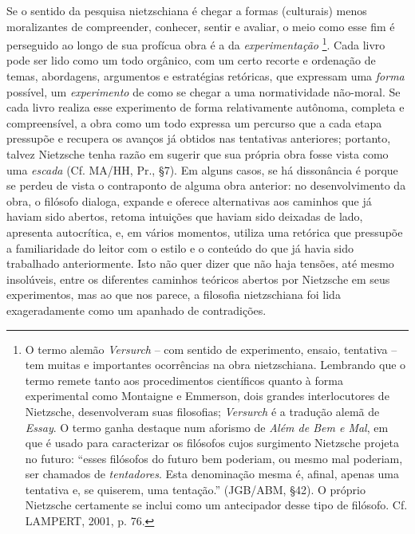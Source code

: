 \documentclass[
	12pt,				%
	openright,			%
	oneside,			%
	a4paper,			%
	english,			%
	french,				%
	spanish,			%
	brazil				%
	]{abntex2}
\begin{document}
	Se o sentido da pesquisa nietzschiana é chegar a formas (culturais) menos moralizantes de compreender, conhecer, sentir e avaliar, o meio como esse fim é perseguido ao longo de sua profícua obra é a da \textit{experimentação}
\footnote{O termo alemão \textit{Versurch} –  com sentido de experimento, ensaio, tentativa – tem muitas e importantes ocorrências na obra nietzschiana. Lembrando que o termo remete tanto aos procedimentos científicos quanto à forma experimental como Montaigne e Emmerson, dois grandes interlocutores de Nietzsche, desenvolveram suas filosofias; \textit{Versurch} é a tradução alemã de \textit{Essay}. O termo ganha destaque num aforismo de \textit{Além de Bem e Mal}, em que é usado para caracterizar os filósofos cujos surgimento Nietzsche projeta no futuro: “esses filósofos do futuro bem poderiam, ou mesmo mal poderiam, ser chamados de \textit{tentadores}. Esta denominação mesma é, afinal, apenas uma tentativa e, se quiserem, uma tentação.” (JGB/ABM, §42). O próprio Nietzsche certamente se inclui como um antecipador desse tipo de filósofo. Cf. LAMPERT, 2001, p. 76.}. 
Cada livro pode ser lido como um todo orgânico, com um certo recorte e ordenação de temas, abordagens, argumentos e estratégias retóricas, que expressam uma \textit{forma} possível, um \textit{experimento} de como se chegar a uma normatividade não-moral. Se cada livro realiza esse experimento de forma relativamente autônoma, completa e compreensível, a obra como um todo expressa um percurso que a cada etapa pressupõe e recupera os avanços já obtidos nas tentativas anteriores; portanto, talvez Nietzsche tenha razão em sugerir que sua própria obra fosse vista como uma \textit{escada} (Cf. MA/HH, Pr., §7). Em alguns casos, se há dissonância é porque se perdeu de vista o contraponto de alguma obra anterior: no desenvolvimento da obra, o filósofo dialoga, expande e oferece alternativas aos caminhos que já haviam sido abertos, retoma intuições que haviam sido deixadas de lado, apresenta autocrítica, e, em vários momentos, utiliza uma retórica que pressupõe a familiaridade do leitor com o estilo e o conteúdo do que já havia sido trabalhado anteriormente. Isto não quer dizer que não haja tensões, até mesmo insolúveis, entre os diferentes caminhos teóricos abertos por Nietzsche em seus experimentos, mas ao que nos parece, a filosofia nietzschiana foi lida exageradamente como um apanhado de contradições.
\end{document}
